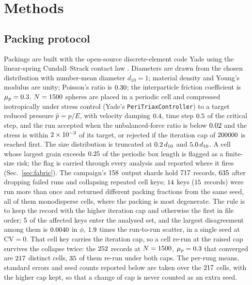 \documentclass[reprint,aps,pre,amsmath,amssymb,superscriptaddress,longbibliography,nofootinbib,floatfix]{revtex4-2}
\newcommand{\pHat}{\hat{p}}
\newcommand{\mup}{\mu_{p}}
\newcommand{\CV}{\mathrm{CV}}
\newcommand{\dten}{d_{10}}
\begin{document}
\section{Methods}

\subsection{Packing protocol}

Packings are built with the open-source discrete-element code Yade \cite{smilauer2021yade} using the linear-spring Cundall--Strack contact law \cite{cundall1979discrete}.
Diameters are drawn from the chosen distribution with number-mean diameter $\dten=1$; material density and Young's modulus are unity; Poisson's ratio is $0.30$; the interparticle friction coefficient is $\mup=\muP$.
$N=1500$ spheres are placed in a periodic cell and compressed isotropically under stress control (Yade's \texttt{PeriTriaxController}) to a target reduced pressure $\pHat=p/E$, with velocity damping $0.4$, time step $0.5$ of the critical step, and the run accepted when the unbalanced-force ratio is below $0.02$ and the stress is within $2\times10^{-3}$ of its target, or rejected if the iteration cap of $200000$ is reached first.
The size distribution is truncated at $\truncLo\,\dten$ and $\truncHi\,\dten$.
A cell whose largest grain exceeds $0.25$ of the periodic box length is flagged as a finite-size risk; the flag is carried through every analysis and reported where it fires (Sec.~\ref{sec:fabric}).
The campaign's $158$ output shards hold $717$ records, $635$ after dropping failed runs and collapsing repeated cell keys; $14$ keys ($15$ records) were run more than once and returned different packing fractions from the same seed, all of them monodisperse cells, where the packing is most degenerate.
The rule is to keep the record with the higher iteration cap and otherwise the first in file order; $5$ of the affected keys enter the analysed set, and the largest disagreement among them is $0.0040$ in $\phi$, $1.9$ times the run-to-run scatter, in a single seed at $\CV=0$.
That cell key carries the iteration cap, so a cell re-run at the raised cap survives the collapse twice: the $252$ records at $N=1500$, $\mup=\muP$ that converged are $217$ distinct cells, $35$ of them re-run under both caps.
The per-rung means, standard errors and seed counts reported below are taken over the $217$ cells, with the higher cap kept, so that a change of cap is never counted as an extra seed.
\end{document}
